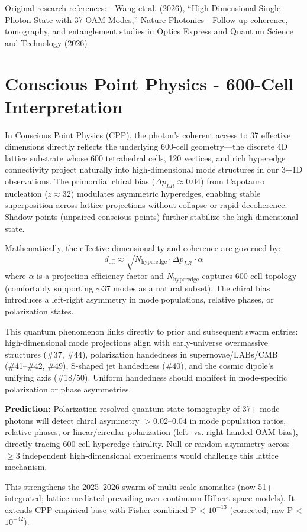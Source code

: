 \documentclass[11pt]{article}
\begin{document}
Original research references:  
- Wang et al. (2026), ``High-Dimensional Single-Photon State with 37 OAM Modes,'' Nature Photonics  
- Follow-up coherence, tomography, and entanglement studies in Optics Express and Quantum Science and Technology (2026)

\section{Conscious Point Physics - 600-Cell Interpretation}
In Conscious Point Physics (CPP), the photon's coherent access to 37 effective dimensions directly reflects the underlying 600-cell geometry—the discrete 4D lattice substrate whose 600 tetrahedral cells, 120 vertices, and rich hyperedge connectivity project naturally into high-dimensional mode structures in our 3+1D observations. The primordial chiral bias ($\Delta p_{LR} \approx 0.04$) from Capotauro nucleation ($z \approx 32$) modulates asymmetric hyperedges, enabling stable superposition across lattice projections without collapse or rapid decoherence. Shadow points (unpaired conscious points) further stabilize the high-dimensional state.

Mathematically, the effective dimensionality and coherence are governed by:  
\[
d_{\text{eff}} \approx \sqrt{N_{\text{hyperedge}} \cdot \Delta p_{LR}} \cdot \alpha
\]  
where $\alpha$ is a projection efficiency factor and $N_{\text{hyperedge}}$ captures 600-cell topology (comfortably supporting $\sim$37 modes as a natural subset). The chiral bias introduces a left-right asymmetry in mode populations, relative phases, or polarization states.

This quantum phenomenon links directly to prior and subsequent swarm entries: high-dimensional mode projections align with early-universe overmassive structures (\#37, \#44), polarization handedness in supernovae/LABs/CMB (\#41--\#42, \#49), S-shaped jet handedness (\#40), and the cosmic dipole's unifying axis (\#18/50). Uniform handedness should manifest in mode-specific polarization or phase asymmetries.

\textbf{Prediction:} Polarization-resolved quantum state tomography of 37+ mode photons will detect chiral asymmetry $> 0.02$--$0.04$ in mode population ratios, relative phases, or linear/circular polarization (left- vs. right-handed OAM bias), directly tracing 600-cell hyperedge chirality. Null or random asymmetry across $\geq 3$ independent high-dimensional experiments would challenge this lattice mechanism.

This strengthens the 2025--2026 swarm of multi-scale anomalies (now 51+ integrated; lattice-mediated prevailing over continuum Hilbert-space models). It extends CPP empirical base with Fisher combined P < $10^{-13}$ (corrected; raw P < $10^{-42}$).
\end{document}
